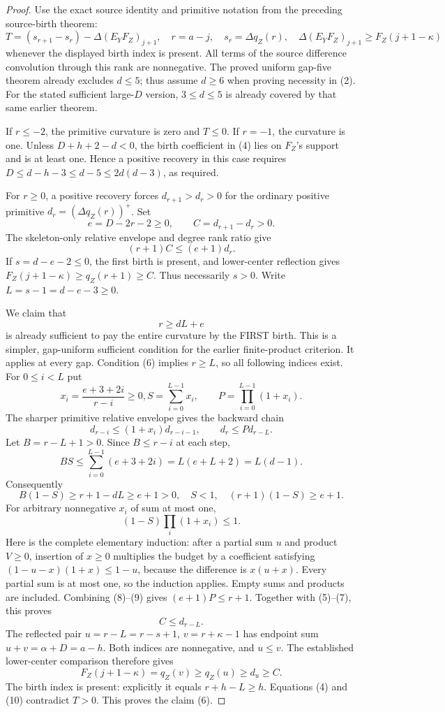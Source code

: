 \begin{proof}
Use the exact source identity and primitive notation from the
preceding source-birth theorem:
\[
 T=(s_{r+1}-s_r)-\Delta(E_YF_Z)_{j+1},\quad
 r=a-j,\quad s_r=\Delta q_Z(r),\quad
 \Delta(E_YF_Z)_{j+1}\ge F_Z(j+1-\kappa)               \tag{4}
\]
whenever the displayed birth index is present. All terms of the
source difference convolution through this rank are nonnegative.
The proved uniform gap-five theorem already excludes $d\le5$;
thus assume $d\ge6$ when proving necessity in (2).
For the stated sufficient large-$D$ version, $3\le d\le5$
is already covered by that same earlier theorem.

If $r\le-2$, the primitive curvature is zero and $T\le0$.
If $r=-1$, the curvature is one. Unless $D+h+2-d<0$,
the birth coefficient in (4) lies on $F_Z$'s support and is
at least one. Hence a positive recovery in this case requires
$D\le d-h-3\le d-5\le2d(d-3)$, as required.

For $r\ge0$, a positive recovery forces
$d_{r+1}>d_r>0$ for the ordinary positive primitive
$d_r=(\Delta q_Z(r))^+$. Set
\[
       e=D-2r-2\ge0,\qquad C=d_{r+1}-d_r>0.
\]
The skeleton-only relative envelope and degree rank ratio give
\[
                         (r+1)C\le(e+1)d_r.           \tag{5}
\]
If $s=d-e-2\le0$, the first birth is present, and lower-center
reflection gives $F_Z(j+1-\kappa)\ge q_Z(r+1)\ge C$.
Thus necessarily $s>0$. Write $L=s-1=d-e-3\ge0$.

We claim that
\[
                    r\ge dL+e                         \tag{6}
\]
is already sufficient to pay the entire curvature by the FIRST
birth. This is a simpler, gap-uniform sufficient condition for
the earlier finite-product criterion. It applies at every gap.
Condition (6) implies $r\ge L$, so all following indices exist.
For $0\le i<L$ put
\[
             x_i=\frac{e+3+2i}{r-i}\ge0,
             S=\sum_{i=0}^{L-1}x_i,\qquad
             P=\prod_{i=0}^{L-1}(1+x_i).
\]
The sharper primitive relative envelope gives the backward chain
\[
 d_{r-i}\le(1+x_i)d_{r-i-1},\qquad d_r\le P d_{r-L}.   \tag{7}
\]
Let $B=r-L+1>0$. Since $B\le r-i$ at each step,
\[
 BS\le\sum_{i=0}^{L-1}(e+3+2i)
      =L(e+L+2)=L(d-1).
\]
Consequently
\[
 B(1-S)\ge r+1-dL\ge e+1>0,
 \quad S<1,\quad (r+1)(1-S)\ge e+1.                 \tag{8}
\]
For arbitrary nonnegative $x_i$ of sum at most one,
\[
                     (1-S)\prod_i(1+x_i)\le1.         \tag{9}
\]
Here is the complete elementary induction: after a partial sum
$u$ and product $V\ge0$, insertion of $x\ge0$ multiplies the
budget by a coefficient satisfying
$(1-u-x)(1+x)\le1-u$, because the difference is $x(u+x)$.
Every partial sum is at most one, so the induction applies.
Empty sums and products are included.
Combining (8)--(9) gives $(e+1)P\le r+1$.
Together with (5)--(7), this proves
\[
                              C\le d_{r-L}.           \tag{10}
\]
The reflected pair
$u=r-L=r-s+1$, $v=r+\kappa-1$ has endpoint sum
$u+v=\alpha+D=a-h$. Both indices are nonnegative,
and $u\le v$. The established lower-center comparison therefore
gives
\[
 F_Z(j+1-\kappa)=q_Z(v)\ge q_Z(u)\ge d_u\ge C.
\]
The birth index is present: explicitly it equals
$r+h-L\ge h$. Equations (4) and (10) contradict $T>0$.
This proves the claim (6).


\end{proof}
